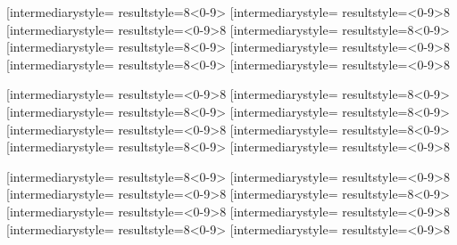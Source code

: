 \documentclass[letterpaper, 17pt]{article}
\newcommand{\white}[1]{}
\begin{document}
\begin{center}
	\vspace{0.3in}

	\opmul[intermediarystyle=\white, resultstyle=\white]{8}{<0-9>}\qquad
	\opmul[intermediarystyle=\white, resultstyle=\white]{<0-9>}{8}\qquad
	\opmul[intermediarystyle=\white, resultstyle=\white]{<0-9>}{8}\qquad
	\opmul[intermediarystyle=\white, resultstyle=\white]{8}{<0-9>}\qquad
	\opmul[intermediarystyle=\white, resultstyle=\white]{8}{<0-9>}\qquad
	\opmul[intermediarystyle=\white, resultstyle=\white]{<0-9>}{8}\qquad
	\opmul[intermediarystyle=\white, resultstyle=\white]{8}{<0-9>}\qquad
	\opmul[intermediarystyle=\white, resultstyle=\white]{<0-9>}{8}\qquad

	\vspace{0.3in}

	\opmul[intermediarystyle=\white, resultstyle=\white]{<0-9>}{8}\qquad
	\opmul[intermediarystyle=\white, resultstyle=\white]{8}{<0-9>}\qquad
	\opmul[intermediarystyle=\white, resultstyle=\white]{8}{<0-9>}\qquad
	\opmul[intermediarystyle=\white, resultstyle=\white]{8}{<0-9>}\qquad
	\opmul[intermediarystyle=\white, resultstyle=\white]{<0-9>}{8}\qquad
	\opmul[intermediarystyle=\white, resultstyle=\white]{8}{<0-9>}\qquad
	\opmul[intermediarystyle=\white, resultstyle=\white]{8}{<0-9>}\qquad
	\opmul[intermediarystyle=\white, resultstyle=\white]{<0-9>}{8}\qquad

	\vspace{0.3in}

	\opmul[intermediarystyle=\white, resultstyle=\white]{8}{<0-9>}\qquad
	\opmul[intermediarystyle=\white, resultstyle=\white]{<0-9>}{8}\qquad
	\opmul[intermediarystyle=\white, resultstyle=\white]{<0-9>}{8}\qquad
	\opmul[intermediarystyle=\white, resultstyle=\white]{8}{<0-9>}\qquad
	\opmul[intermediarystyle=\white, resultstyle=\white]{<0-9>}{8}\qquad
	\opmul[intermediarystyle=\white, resultstyle=\white]{<0-9>}{8}\qquad
	\opmul[intermediarystyle=\white, resultstyle=\white]{8}{<0-9>}\qquad
	\opmul[intermediarystyle=\white, resultstyle=\white]{<0-9>}{8}\qquad


\end{center}
\end{document}
